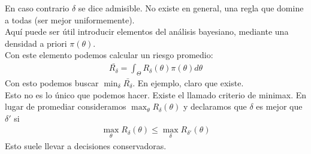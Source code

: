 \documentclass[10pt]{article}
\theoremstyle{plain}
\theoremstyle{definition}
\begin{document}
En caso contrario $\delta$ se dice admisible. No existe en general, una regla que domine a todas (ser mejor uniformemente).\\

Aquí puede ser útil introducir elementos del análisis bayesiano, mediante una densidad a priori $\pi (\theta)$.\\
Con este elemento podemos calcular un riesgo promedio:
\begin{align*}
\bar{R_{\delta}} = \int_{\Theta} R_{\delta}(\theta) \pi(\theta) d\theta
\end{align*}
Con esto podemos buscar $\min_{\delta} \bar{R_{\delta}}$. En ejemplo, claro que existe.\\

Esto no es lo único que podemos hacer. Existe el llamado criterio de minimax. En lugar de promediar consideramos $\max_{\theta}R_{\delta}(\theta)$ y declaramos que $\delta$ es mejor que $\delta'$ si
\begin{align*}
\max_{\theta} R_{\delta}(\theta) \le \max_{\delta} R_{\delta'}(\theta)
\end{align*}
Esto suele llevar a decisiones conservadoras.
\end{document}
